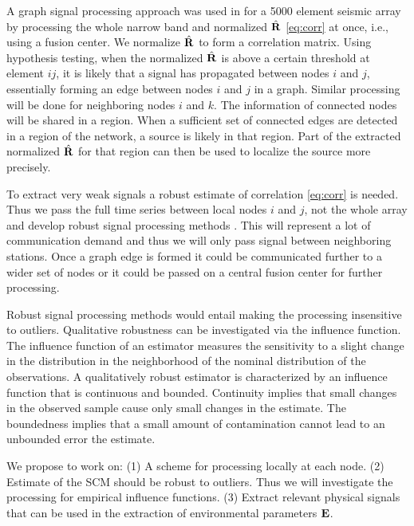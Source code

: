 A graph signal processing approach was used in \cite{riahi2017} for a 5000 element seismic array by processing the whole narrow band and normalized $\hat{\bf R}$ \eqref{eq:corr} at once, i.e., using a fusion center. We normalize 
$\hat{\bf R}$ to form a correlation matrix. %
Using hypothesis testing, when the  normalized $\hat{\bf R }$ is above a certain threshold at  element $ij$, it is likely that a signal has propagated between nodes $i$ and $j$, essentially forming an edge between nodes  $i$ and $j$ in a graph. Similar processing will be done for neighboring nodes $i$ and $k$. The information of connected nodes will be shared in a region. When a sufficient set of connected edges are detected in a region of the network, a source is likely in that region. Part of the extracted normalized $\hat{\bf R}$ for that region can then be used to localize the source more precisely.

To extract very weak signals a robust estimate of correlation \eqref{eq:corr} is needed.  Thus we  pass the full time series between local nodes $i$ and $j$, not the whole array and develop robust signal processing methods \cite{zoubir2018}. This will represent a lot of communication demand and thus we will only pass signal between neighboring stations. Once a graph edge is formed it could  be communicated further to a wider set of nodes or it could be passed on a central fusion center for further processing. 

Robust signal processing methods \cite{zoubir2018} would entail making the processing insensitive to outliers. Qualitative robustness can be investigated via the influence function. The influence function  of an estimator 
measures the sensitivity to a slight change in the distribution
in the neighborhood of the nominal distribution of the observations. 
A qualitatively robust estimator is characterized by an influence function that is continuous and bounded. Continuity implies that small changes in the observed sample cause only small changes in the estimate. The boundedness implies that a small amount of contamination cannot lead to an unbounded error the estimate.

We propose to work on:
(1) A scheme for processing locally at each node. 
(2) Estimate of the SCM should be robust to outliers\cite{zoubir2018}. Thus we will investigate the processing for empirical influence functions.  %
(3) Extract relevant physical signals that can be used in the extraction of environmental parameters $\bf E$.

